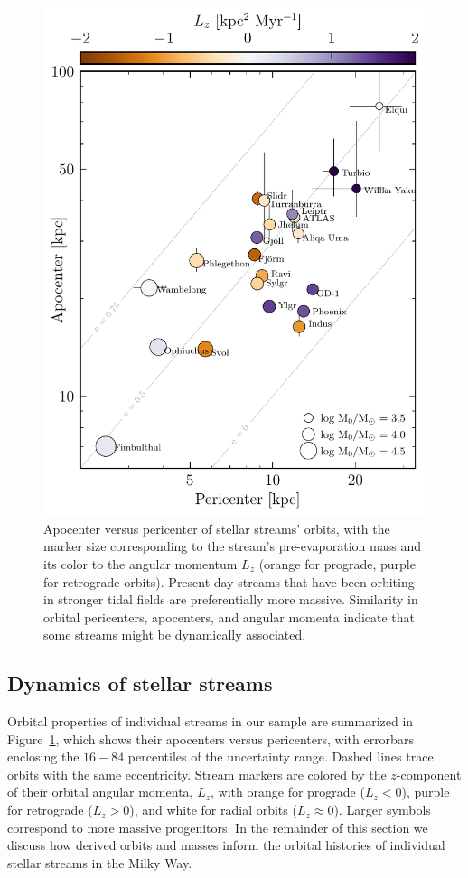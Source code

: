 \documentclass[twocolumn]{aastex63}
\begin{document}
\begin{figure}
\includegraphics[width=\hsize]{figures/streams_peri_apo.pdf}
\caption{
Apocenter versus pericenter of stellar streams' orbits, with the marker size corresponding to the stream's pre-evaporation mass and its color to the angular momentum $L_z$ (orange for prograde, purple for retrograde orbits).
Present-day streams that have been orbiting in stronger tidal fields are preferentially more massive.
Similarity in orbital pericenters, apocenters, and angular momenta indicate that some streams might be dynamically associated.
}
\label{fig:individual_summary}
\end{figure}


\subsection{Dynamics of stellar streams}
\label{sec:discuss_dynamics}
Orbital properties of individual streams in our sample are summarized in Figure~\ref{fig:individual_summary}, which shows their apocenters versus pericenters, with errorbars enclosing the $16-84$ percentiles of the uncertainty range.
Dashed lines trace orbits with the same eccentricity.
Stream markers are colored by the $z$-component of their orbital angular momenta, $L_z$, with orange for prograde ($L_z<0$), purple for retrograde ($L_z>0$), and white for radial orbits ($L_z\approx0$).
Larger symbols correspond to more massive progenitors.
In the remainder of this section we discuss how derived orbits and masses inform the orbital histories of individual stellar streams in the Milky Way.
\end{document}

